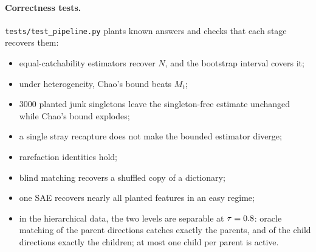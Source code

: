 \paragraph{Correctness tests.} \texttt{tests/test\_pipeline.py} plants known answers and checks that each stage recovers them:
\begin{itemize}\setlength\itemsep{0pt}
\item equal-catchability estimators recover $N$, and the bootstrap interval covers it;
\item under heterogeneity, Chao's bound beats $M_t$;
\item 3000 planted junk singletons leave the singleton-free estimate unchanged while Chao's bound explodes;
\item a single stray recapture does not make the bounded estimator diverge;
\item rarefaction identities hold;
\item blind matching recovers a shuffled copy of a dictionary;
\item one SAE recovers nearly all planted features in an easy regime;
\item in the hierarchical data, the two levels are separable at $\tau=0.8$: oracle matching of the parent directions catches exactly the parents, and of the child directions exactly the children; at most one child per parent is active.
\end{itemize}

\begin{table}[h]
\centering\small
\caption{Pythia-70M: singleton-free estimate at three matching thresholds, and the number of features all \RealSeeds{} seeds share.}
\label{tab:real_tau}

\end{table}
